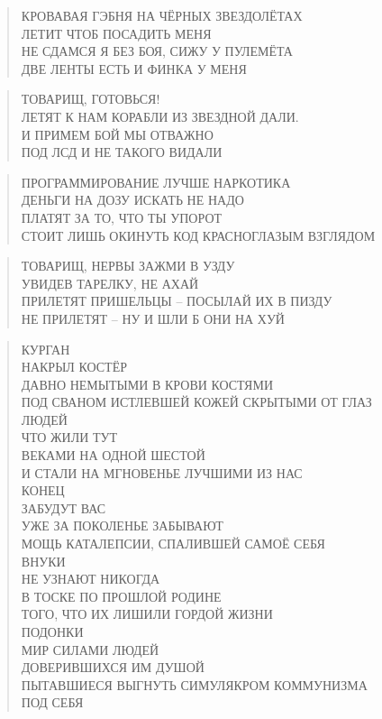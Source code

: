 \poemtitle{***}
\begin{verse}
КРОВАВАЯ ГЭБНЯ НА ЧЁРНЫХ ЗВЕЗДОЛЁТАХ\\
ЛЕТИТ ЧТОБ ПОСАДИТЬ МЕНЯ\\
НЕ СДАМСЯ Я БЕЗ БОЯ, СИЖУ У ПУЛЕМЁТА\\
ДВЕ ЛЕНТЫ ЕСТЬ И ФИНКА У МЕНЯ
\end{verse}

\poemtitle{***}
\begin{verse}
ТОВАРИЩ, ГОТОВЬСЯ!\\
ЛЕТЯТ К НАМ КОРАБЛИ ИЗ ЗВЕЗДНОЙ ДАЛИ.\\
И ПРИМЕМ БОЙ МЫ ОТВАЖНО\\
ПОД ЛСД И НЕ ТАКОГО ВИДАЛИ
\end{verse}

\poemtitle{***}
\begin{verse}
ПРОГРАММИРОВАНИЕ ЛУЧШЕ НАРКОТИКА\\
ДЕНЬГИ НА ДОЗУ ИСКАТЬ НЕ НАДО\\
ПЛАТЯТ ЗА ТО, ЧТО ТЫ УПОРОТ\\
СТОИТ ЛИШЬ ОКИНУТЬ КОД КРАСНОГЛАЗЫМ ВЗГЛЯДОМ
\end{verse}

\poemtitle{***}
\begin{verse}
ТОВАРИЩ, НЕРВЫ ЗАЖМИ В УЗДУ\\
УВИДЕВ ТАРЕЛКУ, НЕ АХАЙ\\
ПРИЛЕТЯТ ПРИШЕЛЬЦЫ -- ПОСЫЛАЙ ИХ В ПИЗДУ\\
НЕ ПРИЛЕТЯТ -- НУ И ШЛИ Б ОНИ НА ХУЙ
\end{verse}

\poemtitle{***}
\begin{verse}
КУРГАН\\
НАКРЫЛ КОСТЁР \\
ДАВНО НЕМЫТЫМИ В КРОВИ КОСТЯМИ\\
ПОД СВАНОМ ИСТЛЕВШЕЙ КОЖЕЙ СКРЫТЫМИ ОТ ГЛАЗ\\
ЛЮДЕЙ\\
ЧТО ЖИЛИ ТУТ \\
ВЕКАМИ НА ОДНОЙ ШЕСТОЙ\\
И СТАЛИ НА МГНОВЕНЬЕ ЛУЧШИМИ ИЗ НАС\\
КОНЕЦ\\
ЗАБУДУТ ВАС\\
УЖЕ ЗА ПОКОЛЕНЬЕ ЗАБЫВАЮТ\\
МОЩЬ КАТАЛЕПСИИ, СПАЛИВШЕЙ САМОЁ СЕБЯ\\
ВНУКИ\\
НЕ УЗНАЮТ НИКОГДА\\
В ТОСКЕ ПО ПРОШЛОЙ РОДИНЕ\\
ТОГО, ЧТО ИХ ЛИШИЛИ ГОРДОЙ ЖИЗНИ\\
ПОДОНКИ\\
МИР СИЛАМИ ЛЮДЕЙ\\
ДОВЕРИВШИХСЯ ИМ ДУШОЙ\\
ПЫТАВШИЕСЯ ВЫГНУТЬ СИМУЛЯКРОМ КОММУНИЗМА \\
ПОД СЕБЯ
\end{verse}

